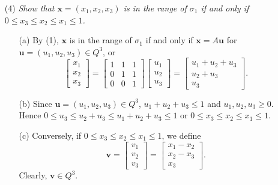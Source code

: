 \documentclass{article}
\begin{document}
\begin{enumerate}
\item[(4)]
  \emph{Show that $\mathbf{x} = (x_1, x_2, x_3)$ is in the range of $\sigma_1$
  if and only if $0 \leq x_3 \leq x_2 \leq x_1 \leq 1$.}
  \begin{enumerate}
  \item[(a)]
    By (1),
    $\mathbf{x}$ is in the range of $\sigma_1$ if and only if
    $\mathbf{x} = A\mathbf{u}$ for $\mathbf{u} = (u_1,u_2,u_3) \in Q^3$, or
    \[
      \begin{bmatrix}
          x_1 \\
          x_2 \\
          x_3
      \end{bmatrix}
      =
      \begin{bmatrix}
          1 & 1 & 1 \\
          0 & 1 & 1 \\
          0 & 0 & 1
      \end{bmatrix}
      \begin{bmatrix}
          u_1 \\
          u_2 \\
          u_3
      \end{bmatrix}
      =
      \begin{bmatrix}
          u_1+u_2+u_3 \\
          u_2+u_3 \\
          u_3
      \end{bmatrix}.
    \]

  \item[(b)]
    Since $\mathbf{u} = (u_1,u_2,u_3) \in Q^3$,
    $u_1+u_2+u_3 \leq 1$ and $u_1,u_2,u_3 \geq 0$.
    Hence $0 \leq u_3 \leq u_2+u_3 \leq u_1+u_2+u_3 \leq 1$
    or $0 \leq x_3 \leq x_2 \leq x_1 \leq 1$.

  \item[(c)]
    Conversely, if $0 \leq x_3 \leq x_2 \leq x_1 \leq 1$,
    we define
    \[
      \mathbf{v}
      =
      \begin{bmatrix}
          v_1 \\
          v_2 \\
          v_3
      \end{bmatrix}
      =
      \begin{bmatrix}
          x_1-x_2 \\
          x_2-x_3 \\
          x_3
      \end{bmatrix}.
    \]
    Clearly, $\mathbf{v} \in Q^3$.
  \end{enumerate}


\end{enumerate}
\end{document}
